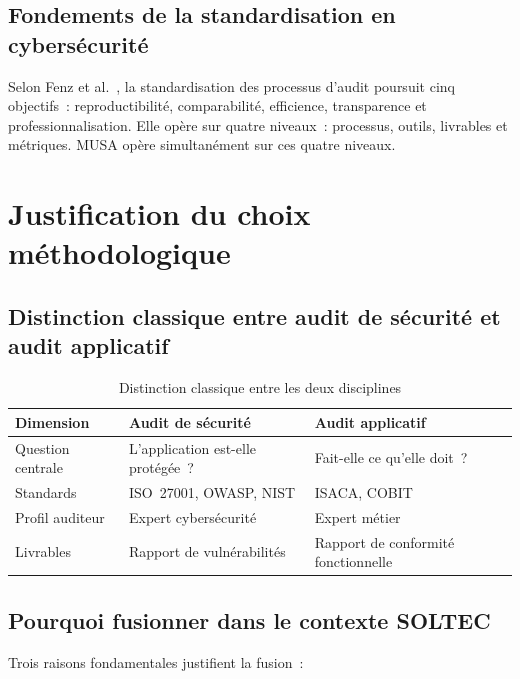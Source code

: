 \documentclass[12pt,a4paper,oneside]{report}
\begin{document}
\subsection{Fondements de la standardisation en cybersécurité}

Selon Fenz et al.~\cite{fenz2014}, la standardisation des processus d'audit poursuit
cinq objectifs~: reproductibilit\'e, comparabilit\'e, efficience, transparence et
professionnalisation. Elle op\`ere sur quatre niveaux~: processus, outils, livrables
et m\'etriques. MUSA op\`ere simultan\'ement sur ces quatre niveaux.

\section{Justification du choix m\'ethodologique}

\subsection{Distinction classique entre audit de s\'ecurit\'e et audit applicatif}

\begin{table}[H]
\centering\small
\caption{Distinction classique entre les deux disciplines}
\label{tab:distinction}
\begin{tabularx}{\textwidth}{p{3.5cm}p{5cm}X}
\toprule
\rowcolor{theadcolor}
\color{white}\textbf{Dimension} &
\color{white}\textbf{Audit de s\'ecurit\'e} &
\color{white}\textbf{Audit applicatif} \\
\midrule
Question centrale & L'application est-elle prot\'eg\'ee~? &
  Fait-elle ce qu'elle doit~? \\
Standards & ISO~27001, OWASP, NIST & ISACA, COBIT \\
Profil auditeur & Expert cybers\'ecurit\'e & Expert m\'etier \\
Livrables & Rapport de vuln\'erabilit\'es &
  Rapport de conformit\'e fonctionnelle \\
\bottomrule
\end{tabularx}
\end{table}

\subsection{Pourquoi fusionner dans le contexte SOLTEC}

Trois raisons fondamentales justifient la fusion~:
\end{document}
